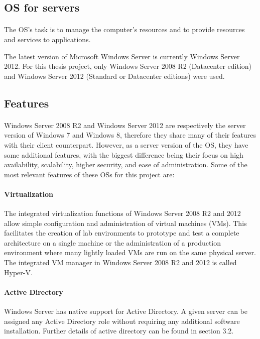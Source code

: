\subsection{OS for servers}
\paragraph{}
The OS's task is to manage the computer's resources and to provide resources and services to applications.

The latest version of Microsoft Windows Server is currently Windows Server 2012. For this thesis project, only Windows Server 2008 R2 (Datacenter edition) and Windows Server 2012 (Standard or Datacenter editions) were used.


\subsection{Features}
\paragraph{}
Windows Server 2008 R2 and Windows Server 2012 are respectively the server version of Windows 7 and Windows 8, therefore they share many of their features with their client counterpart. However, as a server version of the OS, they have some additional features, with the biggest difference being their focus on high availability, scalability, higher security, and ease of administration. Some of the most relevant features of these OSs for this project are:

\paragraph{Virtualization}
The integrated virtualization functions of Windows Server 2008 R2 and 2012 allow simple configuration and administration of virtual machines (VMs). This facilitates the creation of lab environments to prototype and test a complete architecture on a single machine or the administration of a production environment where many lightly loaded VMs are run on the same physical server. The integrated VM manager in Windows Server 2008 R2 and 2012 is called Hyper-V.

\paragraph{Active Directory}
Windows Server has native support for Active Directory. A given server can be assigned any Active Directory role without requiring any additional software installation. Further details of active directory can be found in section 3.2.

